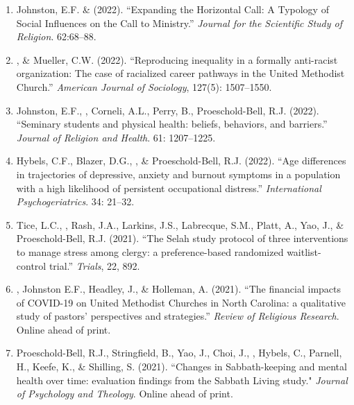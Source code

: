 \begin{enumerate}
\item Johnston, E.F. \& \Eagle  \hspace{.1em} (2022). ``Expanding the Horizontal Call: A Typology of Social Influences on the Call to Ministry.'' \textit{Journal for the Scientific Study of Religion}. 62:68--88.  

\item \Eagle, \& Mueller, C.W. \hspace{.1em} (2022). ``Reproducing inequality in a formally anti-racist organization: The case of racialized career pathways in the United Methodist Church.'' \textit{American Journal of Sociology}, 127(5): 1507–1550. 

\item Johnston, E.F., \Eagle, Corneli, A.L., Perry, B., Proeschold-Bell, R.J.  (2022). ``Seminary students and physical health: beliefs, behaviors, and barriers.'' \textit{Journal of Religion and Health}. 61: 1207--1225. 

\item Hybels, C.F., Blazer, D.G., \Eagle, \& Proeschold-Bell, R.J. (2022). ``Age differences in trajectories of depressive, anxiety and burnout symptoms in a population with a high likelihood of persistent occupational distress.'' \emph{International Psychogeriatrics}. 34: 21--32. 

\item Tice, L.C., \Eagle, Rash, J.A., Larkins, J.S., Labrecque, S.M., Platt, A., Yao, J., \& Proeschold-Bell, R.J. (2021). ``The Selah study protocol of three interventions to manage stress among clergy: a preference-based randomized waitlist-control trial.''  \textit{Trials}, 22, 892. 
	
\item \Eagle, Johnston E.F., Headley, J., \& Holleman, A. (2021). ``The financial impacts of COVID-19 on United Methodist Churches in North Carolina: a qualitative study of pastors’ perspectives and strategies.'' \emph{Review of Religious Research}. Online ahead of print. 

\item Proeschold-Bell, R.J., Stringfield, B., Yao, J., Choi, J., \Eagle, Hybels, C., Parnell, H., Keefe, K., \& Shilling, S. (2021). ``Changes in Sabbath-keeping and mental health over time: evaluation findings from the Sabbath Living study." \textit{Journal of Psychology and Theology}. Online ahead of print. 
	

\end{enumerate}
